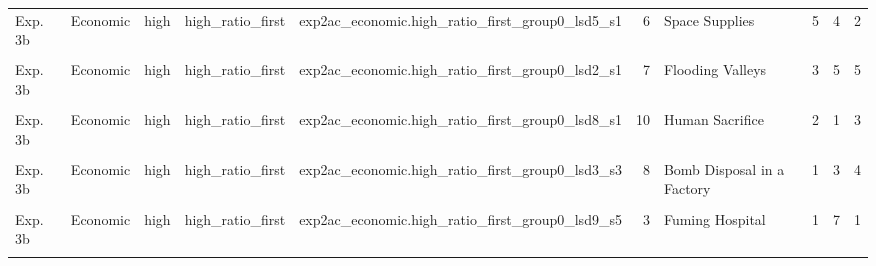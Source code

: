 \documentclass[
]{article}
\begin{document}
\begin{longtable}[t]{lllllrlrrr}
Exp. 3b & Economic & high & high\_ratio\_first & exp2ac\_economic.high\_ratio\_first\_group0\_lsd5\_s1 & 6 & Space Supplies & 5 & 4 & 2\\
\addlinespace
\cellcolor{gray!10}{Exp. 3b} & \cellcolor{gray!10}{Economic} & \cellcolor{gray!10}{high} & \cellcolor{gray!10}{high\_ratio\_first} & \cellcolor{gray!10}{exp2ac\_economic.high\_ratio\_first\_group0\_lsd12\_s5} & \cellcolor{gray!10}{7} & \cellcolor{gray!10}{Flooding Valleys} & \cellcolor{gray!10}{3} & \cellcolor{gray!10}{2} & \cellcolor{gray!10}{3}\\
Exp. 3b & Economic & high & high\_ratio\_first & exp2ac\_economic.high\_ratio\_first\_group0\_lsd2\_s1 & 7 & Flooding Valleys & 3 & 5 & 5\\
\cellcolor{gray!10}{Exp. 3b} & \cellcolor{gray!10}{Economic} & \cellcolor{gray!10}{high} & \cellcolor{gray!10}{high\_ratio\_first} & \cellcolor{gray!10}{exp2ac\_economic.high\_ratio\_first\_group0\_lsd4\_s1} & \cellcolor{gray!10}{7} & \cellcolor{gray!10}{Flooding Valleys} & \cellcolor{gray!10}{3} & \cellcolor{gray!10}{5} & \cellcolor{gray!10}{2}\\
Exp. 3b & Economic & high & high\_ratio\_first & exp2ac\_economic.high\_ratio\_first\_group0\_lsd8\_s1 & 10 & Human Sacrifice & 2 & 1 & 3\\
\cellcolor{gray!10}{Exp. 3b} & \cellcolor{gray!10}{Economic} & \cellcolor{gray!10}{high} & \cellcolor{gray!10}{high\_ratio\_first} & \cellcolor{gray!10}{exp2ac\_economic.high\_ratio\_first\_group0\_lsd8\_s4} & \cellcolor{gray!10}{10} & \cellcolor{gray!10}{Human Sacrifice} & \cellcolor{gray!10}{2} & \cellcolor{gray!10}{1} & \cellcolor{gray!10}{4}\\
\addlinespace
Exp. 3b & Economic & high & high\_ratio\_first & exp2ac\_economic.high\_ratio\_first\_group0\_lsd3\_s3 & 8 & Bomb Disposal in a Factory & 1 & 3 & 4\\
\cellcolor{gray!10}{Exp. 3b} & \cellcolor{gray!10}{Economic} & \cellcolor{gray!10}{high} & \cellcolor{gray!10}{high\_ratio\_first} & \cellcolor{gray!10}{exp2ac\_economic.high\_ratio\_first\_group0\_lsd1\_s2} & \cellcolor{gray!10}{12} & \cellcolor{gray!10}{Forced Siege} & \cellcolor{gray!10}{1} & \cellcolor{gray!10}{1} & \cellcolor{gray!10}{1}\\
Exp. 3b & Economic & high & high\_ratio\_first & exp2ac\_economic.high\_ratio\_first\_group0\_lsd9\_s5 & 3 & Fuming Hospital & 1 & 7 & 1\\
\cellcolor{gray!10}{Exp. 3b} & \cellcolor{gray!10}{Economic} & \cellcolor{gray!10}{high} & \cellcolor{gray!10}{high\_ratio\_first} & \cellcolor{gray!10}{exp2ac\_economic.high\_ratio\_first\_group0\_lsd8\_s3} & \cellcolor{gray!10}{5} & \cellcolor{gray!10}{Hopsital Power Outage} & \cellcolor{gray!10}{1} & \cellcolor{gray!10}{1} & \cellcolor{gray!10}{1}\\

\end{longtable}
\end{document}
